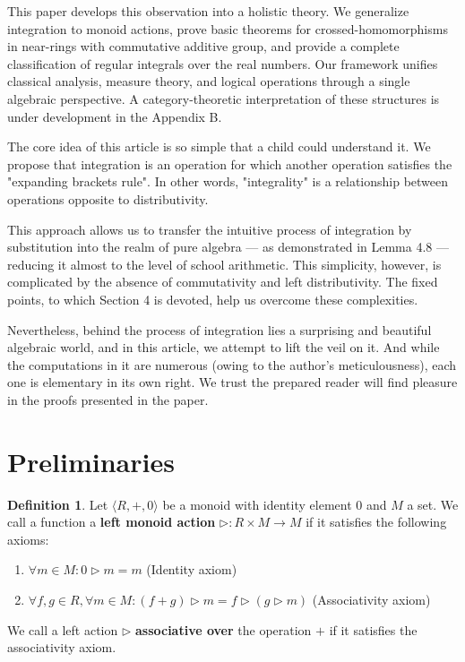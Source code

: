 \documentclass[12pt]{article}
\theoremstyle{definition}
\newtheorem{definition}{Definition}[section]
\begin{document}
\vspace{5pt}

This paper develops this observation into a holistic theory. We generalize integration to monoid actions, 
prove basic theorems for crossed-homomorphisms in near-rings with commutative additive group, and provide 
a complete classification of regular integrals over the real numbers. 
Our framework unifies classical analysis, measure theory, and logical operations through a single algebraic perspective. A category-theoretic 
interpretation of these structures is under development in the Appendix B.

\vspace{5pt}

The core idea of this article is so simple that a child could understand it. We propose that integration is an operation for which another operation satisfies the "expanding brackets rule". In other words, "integrality" is a relationship between operations opposite to distributivity.

\vspace{5pt}

This approach allows us to transfer the intuitive process of integration by substitution into the realm of pure algebra — as demonstrated in Lemma 4.8 — reducing it almost to the level of school arithmetic. This simplicity, however, is complicated by the absence of commutativity and left distributivity. The fixed points, to which Section 4 is devoted, help us overcome these complexities.

\vspace{5pt}

Nevertheless, behind the process of integration lies a surprising and beautiful algebraic world, and in this article, we attempt to lift the veil on it. And while the computations in it are numerous (owing to the author's meticulousness), each one is elementary in its own right. We trust the prepared reader will find pleasure in the proofs presented in the paper.

\section{Preliminaries}



\begin{definition}
Let $\langle R, +, 0 \rangle$ be a monoid with identity element $0$ and $M$ a set. 
We call a function a \textbf{left monoid action} $\triangleright : R \times M \to M$ if it satisfies the following axioms: 


\begin{enumerate}
\item $\forall m \in M: 0 \triangleright m = m$ \hfill (Identity axiom)
\item $\forall f, g \in R, \forall m \in M: (f + g) \triangleright m = f \triangleright (g \triangleright m)$ \hfill (Associativity axiom)
\end{enumerate}

We call a left action $\triangleright$ \textbf{associative over} the operation $+$ 
if it satisfies the associativity axiom.
\end{definition}
\end{document}

